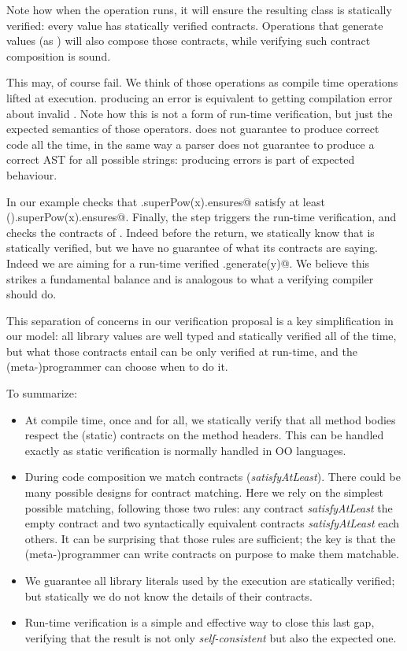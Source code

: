 Note how when the \Q@Override@ operation  runs, it will
ensure the resulting class is statically verified:
every \Q@Library@ value has statically verified contracts. Operations 
that generate \Q@Library@ values (as \Q@Override@) will also compose those contracts, while verifying such
contract composition is sound.

This may, of course fail.
We think of those operations as compile time operations lifted at execution.
\Q@Override@ producing an error is  equivalent to
getting compilation error about invalid \Q@extends@.
Note how this is not a form of run-time verification, but just the expected semantics of those operators.
\Q@Override@ does not guarantee to produce correct code all the time, in the same way a parser does not guarantee to produce a correct AST for all possible strings: producing errors is part of \Q@Override@ expected behaviour.

In our example \Q@Override@ checks that \Q@res.superPow(x).ensures@
 satisfy at least \Q@inductive().superPow(x).ensures@.
Finally, the \Q@return@ step triggers the run-time verification, and
checks the contracts of \Q@res@.
Indeed before the return, we statically know that \Q@res@ is statically verified,
 but we have no guarantee of what its contracts are saying.
Indeed we are aiming for a run-time verified \Q@Pow.generate(y)@.
We believe this strikes a fundamental balance and is analogous to what a
verifying compiler~\cite{hoare2003verifying} should do.

This separation of concerns in our verification proposal is a key simplification
in our model:
all library values are well typed and statically verified all of the time,
but what those contracts entail can be only verified at run-time, and
the (meta-)programmer can choose when to do it.



\noindent
To summarize:
\begin{itemize}
\item
At compile time, once and for all, we statically verify that all
method bodies respect the (static) contracts on the method headers.
This can be handled exactly as static verification is normally handled in OO languages.
\item
During code composition we match contracts (\emph{satisfyAtLeast}).
There could be many possible designs for contract matching.
Here we rely on the simplest possible matching, following those two rules:
any contract \emph{satisfyAtLeast} the empty contract
and two syntactically equivalent contracts \emph{satisfyAtLeast} each others.
It can be surprising that those rules are sufficient;
the key is that 
the (meta-)programmer can write contracts
on purpose to make them matchable.
\item
We guarantee all library literals used by the execution are statically verified; but
statically we do not know the details of their contracts.
\item
Run-time verification is a simple and effective way to close this last gap, verifying
that the result is not only \emph{self-consistent} but also the expected one.
\end{itemize}


